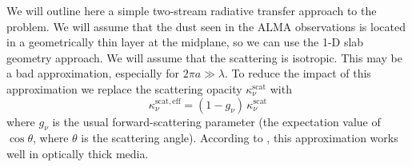 \documentclass{aa}
\begin{document}
We will outline here a simple two-stream radiative transfer approach to the
problem. We will assume that the dust seen in the ALMA observations is located
in a geometrically thin layer at the midplane, so we can use the 1-D slab
geometry approach. We will assume that the scattering is isotropic. This
may be a bad approximation, especially for $2\pi a\gg \lambda$. To reduce
the impact of this approximation we replace the scattering opacity
$\kappa_\nu^{\mathrm{scat}}$
with
\begin{equation}
\kappa_\nu^{\mathrm{scat,eff}} = (1-g_\nu)\, \kappa_\nu^{\mathrm{scat}}
\end{equation}
where $g_\nu$ is the usual forward-scattering parameter (the expectation
value of $\cos\theta$, where $\theta$ is the scattering angle). According
to \citet{1978wpsr.book.....I}, this approximation works well in
optically thick media.
\end{document}
